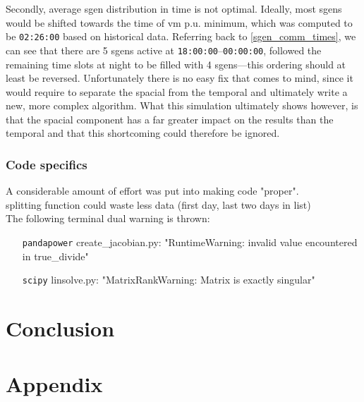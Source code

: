 \documentclass[a4paper,10pt]{report}
\begin{document}
Secondly, average sgen distribution in time is not optimal. Ideally, most sgens would be shifted towards the time of vm p.u. minimum, which was computed to be \texttt{02:26:00} based on historical data. Referring back to \cref{sgen_comm_times}, we can see that there are 5 sgens active at \texttt{18:00:00}--\texttt{00:00:00}, followed the remaining time slots at night to be filled with 4 sgens---this ordering should at least be reversed. Unfortunately there is no easy fix that comes to mind, since it would require to separate the spacial from the temporal and ultimately write a new, more complex algorithm. What this simulation ultimately shows however, is that the spacial component has a far greater impact on the results than the temporal and that this shortcoming could therefore be ignored.




\subsection{Code specifics}
A considerable amount of effort was put into making code "proper".\\
splitting function could waste less data (first day, last two days in list)\\

\noindent
The following terminal dual warning is thrown:
\begin{itemize}[leftmargin=2.2cm]
	\item[\texttt{pandapower}] create\_jacobian.py: "RuntimeWarning: invalid value encountered in true\_divide"
	\item[\texttt{scipy}] linsolve.py: "MatrixRankWarning: Matrix is exactly singular"
\end{itemize}



\chapter{Conclusion}


\chapter*{Appendix}\label{chapter_appendix}
\end{document}
